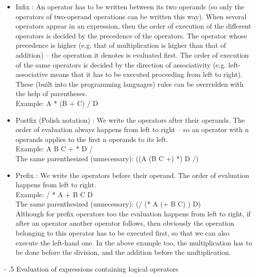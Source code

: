 \documentclass[margin=0px]{article}
\makeatletter
\renewcommand\paragraph{%
    \@startsection{paragraph}{4}{0mm}%
    {-\baselineskip}%
    {.5\baselineskip}%
    {\normalfont\normalsize\bfseries}}
\makeatother
\begin{document}
\begin{itemize}
    \item	Infix : An operator has to be written between its two operands (so only the operators of two-operand operations
          can be written this way).
          When several operators appear in an expression, then the order of execution of the different operators
          is decided by the precedence of the operators. The operator whose precedence is higher (e.g. that of
          multiplication is higher than that of addition) -- the operation it denotes is evaluated first. The order of execution of the same
          operators is decided by the direction of associativity (e.g. left-associative
          means that it has to be executed proceeding from left to right). These (built into the programming languages)
          rules can be overridden with the help of parentheses.\\
          Example: A * (B + C) / D

    \item	Postfix (Polish notation) : We write the operators after their operands. The order of evaluation always
          happens from left to right -- so an operator with n operands applies to the first n operands to its left.\\
          Example: A B C + * D /\\
          The same parenthesized (unnecessary): ((A (B C +) *) D /)

    \item	Prefix : We write the operators before their operand. The order of evaluation happens from left
          to right.\\
          Example: / * A + B C D\\
          The same parenthesized (unnecessary): (/ (* A (+ B C) ) D)\\
          Although for prefix operators too the evaluation happens from left to right, if after an operator
          another operator follows, then obviously the operation belonging to this operator has to be executed first,
          so that we can also execute the left-hand one. In the above example too, the
          multiplication has to be done before the division, and the addition before the multiplication.
\end{itemize}

\paragraph{Evaluation of expressions containing logical operators}
\end{document}
